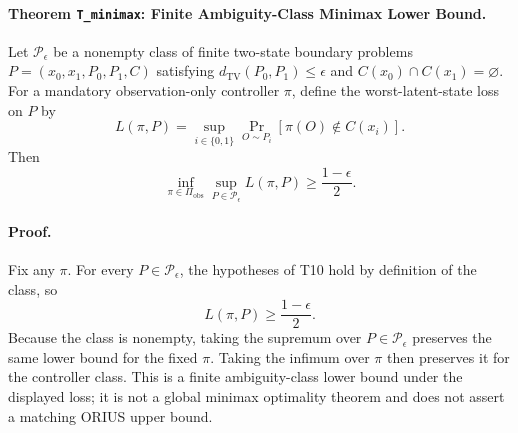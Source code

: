 \paragraph{Theorem \texttt{T\_minimax}: Finite Ambiguity-Class Minimax Lower Bound.}
Let \(\mathcal P_\epsilon\) be a nonempty class of finite two-state boundary
problems \(P=(x_0,x_1,P_0,P_1,C)\) satisfying
\(d_{\mathrm{TV}}(P_0,P_1)\le\epsilon\) and
\(C(x_0)\cap C(x_1)=\varnothing\). For a mandatory observation-only controller
\(\pi\), define the worst-latent-state loss on \(P\) by
\[
  L(\pi,P)=
  \sup_{i\in\{0,1\}}
  \Pr_{O\sim P_i}[\pi(O)\notin C(x_i)] .
\]
Then
\[
  \inf_{\pi\in\Pi_{\mathrm{obs}}}\sup_{P\in\mathcal P_\epsilon}
  L(\pi,P) \ge \frac{1-\epsilon}{2}.
\]

\paragraph{Proof.}
Fix any \(\pi\). For every \(P\in\mathcal P_\epsilon\), the hypotheses of T10
hold by definition of the class, so
\[
  L(\pi,P)\ge\frac{1-\epsilon}{2}.
\]
Because the class is nonempty, taking the supremum over \(P\in\mathcal
P_\epsilon\) preserves the same lower bound for the fixed \(\pi\). Taking the
infimum over \(\pi\) then preserves it for the controller class. This is a
finite ambiguity-class lower bound under the displayed loss; it is not a global
minimax optimality theorem and does not assert a matching ORIUS upper bound.
